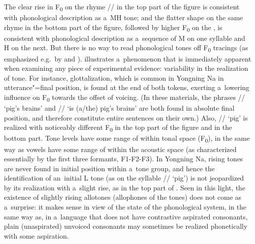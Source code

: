 The clear rise in F\textsubscript{0} on the rhyme // in the top part of the figure is consistent with
phonological description as a~MH tone; and the flatter shape on the same rhyme in the bottom part
of the figure, followed by higher F\textsubscript{0} on the , is consistent with phonological description as
a~sequence of M on one syllable and H on the next. But there is no way to read phonological tones off F\textsubscript{0}
tracings (as emphasized e.g.~by \citealt{cruzetal2014} and \citealt{morey2014}).  illustrates a~phenomenon that is immediately apparent when examining any
piece of experimental evidence: variability in the realization of tone. For instance,
glottalization, which is common in Yongning Na in utterance"=final position, is found at the end of both tokens, exerting a~lowering influence on F\textsubscript{0}
towards the offset of voicing. (In these materials, the phrases // ‘pig’s brains’ and // ‘is
(a/the) pig’s brains’ are both found in absolute final position, and therefore constitute entire sentences on
their own.) Also, //
‘pig’ is realized with noticeably different F\textsubscript{0} in the top part of the figure and in the bottom
part. Tone levels have some range of  within tonal space (F\textsubscript{0}), in the same way as vowels have some
range of  within the acoustic space (as characterized essentially by the first three
formants, F1-F2-F3). In Yongning Na, rising tones are never found in initial position within a~tone
group, and hence the identification of an~initial L tone (as on the syllable // ‘pig’) is not jeopardized
by its realization with a~slight rise, as in the top part of . Seen in this light, the
existence of slightly rising allotones (allophones of the tones) does not come as a~surprise: it makes sense in view of the
state of the phonological system, in the same way as, in a~language that does not have contrastive aspirated
consonants, plain (unaspirated) unvoiced consonants may sometimes be realized phonetically with some
aspiration.

